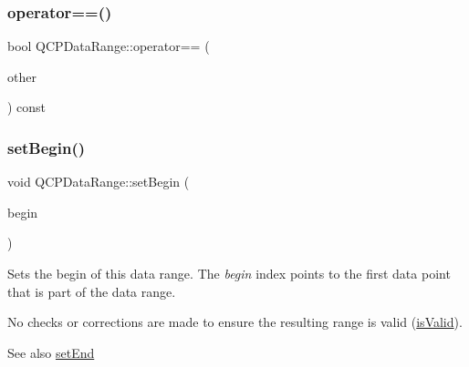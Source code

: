\mbox{\label{class_q_c_p_data_range_a8bfd79a282f6ebd766d60caa683242d3}} 
\subsubsection{\texorpdfstring{operator==()}{operator==()}}
{\footnotesize\ttfamily bool Q\+C\+P\+Data\+Range\+::operator== (\begin{DoxyParamCaption}\item[{const \hyperlink{class_q_c_p_data_range}{Q\+C\+P\+Data\+Range} \&}]{other }\end{DoxyParamCaption}) const\hspace{0.3cm}{\ttfamily [inline]}}

\mbox{\label{class_q_c_p_data_range_a54ff59048e01e46ac4aefafc844626c6}} 
\subsubsection{\texorpdfstring{set\+Begin()}{setBegin()}}
{\footnotesize\ttfamily void Q\+C\+P\+Data\+Range\+::set\+Begin (\begin{DoxyParamCaption}\item[{int}]{begin }\end{DoxyParamCaption})\hspace{0.3cm}{\ttfamily [inline]}}

Sets the begin of this data range. The {\itshape begin} index points to the first data point that is part of the data range.

No checks or corrections are made to ensure the resulting range is valid (\hyperlink{class_q_c_p_data_range_aae53a37472212dca0a7939963e20dba0}{is\+Valid}).

\begin{DoxySeeAlso}{See also}
\hyperlink{class_q_c_p_data_range_a277f1a9eafe70b9184d9c00b641ae5de}{set\+End} 
\end{DoxySeeAlso}
\mbox{\label{class_q_c_p_data_range_a277f1a9eafe70b9184d9c00b641ae5de}} 
